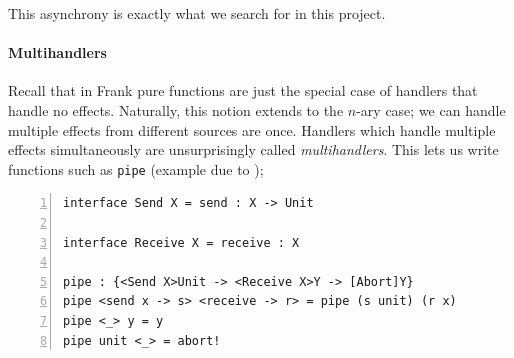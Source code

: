 \documentclass[msc,deptreport,cs]{infthesis} %
\newcommand{\code}[1]{\lstinline{#1}}
\begin{document}
This asynchrony is exactly what we search for in this project.







\paragraph*{Multihandlers}
\label{para:multihandlers}

Recall that in Frank pure functions are just the special case of handlers that
handle no effects. Naturally, this notion extends to the $n$-ary case; we can
handle multiple effects from different sources are once. Handlers which handle
multiple effects simultaneously are unsurprisingly called \emph{multihandlers}.
This lets us write functions such as \code{pipe} (example due to \cite{convent2020doo});

\begin{lstlisting}[numbers=left]
interface Send X = send : X -> Unit

interface Receive X = receive : X
 
pipe : {<Send X>Unit -> <Receive X>Y -> [Abort]Y}
pipe <send x -> s> <receive -> r> = pipe (s unit) (r x)
pipe <_> y = y
pipe unit <_> = abort!
\end{lstlisting}
\end{document}
